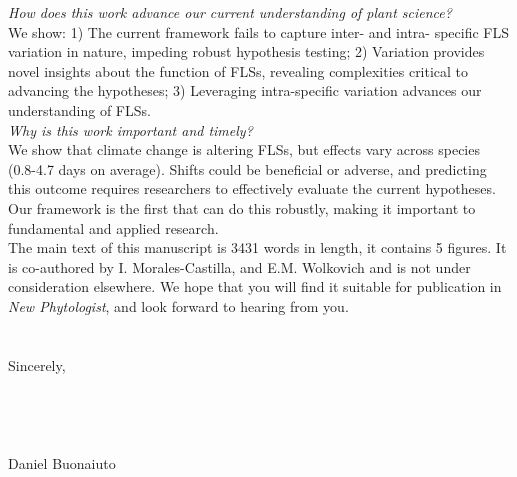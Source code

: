\documentclass[11.5 pt]{article}\usepackage[]{graphicx}\usepackage[]{color}
\begin{document}
\noindent \emph{How does this work advance our current understanding of plant science?}\\
\noindent We show: 1) The current framework fails to capture inter- and intra- specific FLS variation in nature, impeding robust hypothesis testing; 2) Variation provides novel insights about the function of FLSs, revealing complexities critical to advancing the hypotheses; 3) Leveraging intra-specific variation advances our understanding of FLSs.\\ %

\noindent \emph{Why is this work important and timely?}\\
\noindent We show that climate change is altering FLSs, but effects vary across species (0.8-4.7 days on average). Shifts could be beneficial or adverse, and predicting this outcome requires researchers to effectively evaluate the current hypotheses. Our framework is the first that can do this robustly, making it important to fundamental and applied research.\\

\noindent The main text of this manuscript is 3431 words in length, it contains 5 figures. It is co-authored by I. Morales-Castilla, and E.M. Wolkovich and is not under consideration elsewhere. We hope that you will find it suitable for publication in \textit{New Phytologist}, and look forward to hearing from you.\\\\
\\Sincerely,\\\\\\\\\\

\noindent Daniel Buonaiuto\\
\pagebreak

\clearpage



\end{document}
